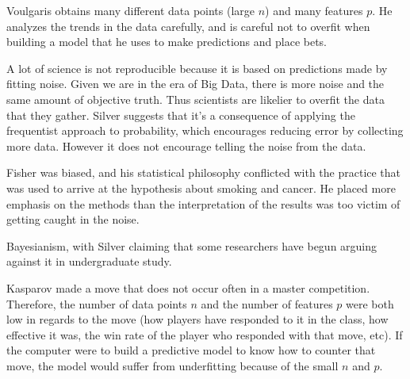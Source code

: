 \documentclass[12pt]{article}
\begin{document}
\begin{enumerate}

Voulgaris obtains many different data points (large $n$) and many features $p$.
He analyzes the trends in the data carefully, and is careful not to overfit
when building a model that he uses to make predictions and place bets.


A lot of science is not reproducible because it is based on predictions
made by fitting noise. Given we are in the era of Big Data, there is more
noise and the same amount of objective truth. Thus scientists are likelier
to overfit the data that they gather. Silver suggests that it's a consequence
of applying the frequentist approach to probability, which encourages reducing
error by collecting more data. However it does not encourage telling the
noise from the data.


Fisher was biased, and his statistical philosophy conflicted with the practice
that was used to arrive at the hypothesis about smoking and cancer. He placed
more emphasis on the methods than the interpretation of the results was too
victim of getting caught in the noise.


Bayesianism, with Silver claiming that some researchers have begun arguing
against it in undergraduate study.


Kasparov made a move that does not occur often in a master competition. Therefore,
the number of data points $n$ and the number of features $p$ were both low in
regards to the move (how players have responded to it in the class, how effective
it was, the win rate of the player who responded with that move, etc). If the
computer were to build a predictive model to know how to counter that move,
the model would suffer from underfitting because of the small $n$ and $p$.



\end{enumerate}
\end{document}
